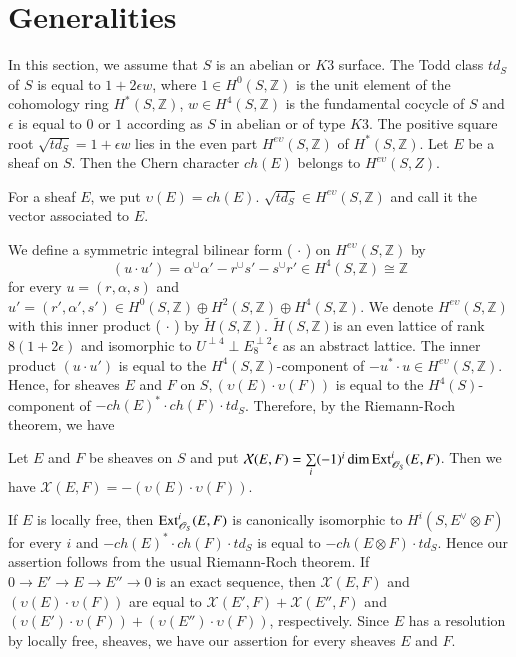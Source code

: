\section{Generalities}\label{s2}

In this section, we assume that $S$ is an abelian or $K3$ surface. The
Todd class $td_S$ of $S$ is equal to $1+2\epsilon w$, where $1\in
H^{0}(S,\mathbb{Z})$ is the unit element of the cohomology ring
$H^{\ast}(S,\mathbb{Z})$, $w \in H^{4}(S,\mathbb{Z})$ is the
fundamental cocycle of $S$ and $\epsilon$ is equal to $0$ or $1$
according as $S$ in abelian or of type $K3$. The positive square root
$\sqrt{td_S}=1+\epsilon w$ lies in the even part
$H^{e\upsilon}(S,\mathbb{Z})$ of $H^{\ast}(S,\mathbb{Z})$. Let $E$ be
a sheaf on $S$. Then the Chern character $ch(E)$ belongs to
$H^{e\upsilon}(S,Z)$. 

\begin{dfn}\label{dfn2.1}
For a sheaf $E$, we put $\upsilon(E)=ch(E)$. $\sqrt{td_S}\in
H^{e\upsilon}(S,\mathbb{Z})$ and call it the vector associated to
$E$. 

We define a symmetric integral bilinear form ( $\cdot$ ) on
$H^{e\upsilon}(S,\mathbb{Z})$ by 
$$
(u\cdot u')=\alpha^{\cup}\alpha'-r^{\cup}s'-s^{\cup}r'\in
H^{4}(S,\mathbb{Z})\cong \mathbb{Z}
$$
for every $u=(r,\alpha, s)$ and $u'=\left(r',\alpha',s'\right)\in
H^{0}(S,\mathbb{Z})\oplus H^{2}(S,\mathbb{Z})\oplus
H^{4}(S,\mathbb{Z})$. We denote $H^{e\upsilon}(S,\mathbb{Z})$ with
this inner product ( $\cdot$ ) by
$\widetilde{H}(S,\mathbb{Z})$. $\widetilde{H}(S,\mathbb{Z})$\pageoriginale is an
even lattice of rank $8(1+2\epsilon)$ and isomorphic to $U^{\perp
  4}\perp E_8^{\perp 2}\epsilon$ as an abstract lattice. The inner
product $(u\cdot u')$ is equal to the $H^{4}(S,\mathbb{Z})$-component
of $-u^{\ast}\cdot u\in H^{e\upsilon}(S,\mathbb{Z})$. Hence, for
sheaves $E$ and $F$ on $S,(\upsilon(E)\cdot \upsilon(F))$ is equal to
the $H^{4}(S)$-component of $-ch(E)^{\ast}\cdot ch(F)\cdot
td_S$. Therefore, by the Riemann-Roch theorem, we have 
\end{dfn}

\begin{Prop}\label{Prop2.2}
Let $E$ and $F$ be sheaves on $S$ and put
$\mathcal{X}(E,F)=\sum\limits_{i}(-1)^{i}\dim
\mathrm{Ext}^{i}_{\mathscr{O}_{S}}(E,F)$. Then we have
$\mathcal{X}(E,F)=-(\upsilon (E)\cdot \upsilon(F))$. 
\end{Prop}

\begin{Proof}
If $E$ is locally free, then $\mathrm{Ext}^{i}_{\mathscr{O}_S}(E, F)$ is
canonically isomorphic to $H^{i}(S,E^{\vee}\otimes F)$ for every $i$ and
$-ch(E)^{\ast}\cdot ch(F)\cdot td_S$ is equal to $-ch(E\otimes F)\cdot
td_S$. Hence our assertion follows from the usual Riemann-Roch
theorem. If $0\to E'\to E\to E''\to 0$ is an exact sequence, then
$\mathcal{X}(E,F)$ and $(\upsilon (E)\cdot\upsilon (F))$ are equal to
$\mathcal{X}(E',F)+\mathcal{X}(E'',F)$ and $(\upsilon (E')\cdot
\upsilon(F))+(\upsilon(E'')\cdot \upsilon(F))$, respectively. Since
$E$ has a resolution by locally free, sheaves, we have our assertion
for every sheaves $E$ and $F$.
\enprf
\end{Proof}

